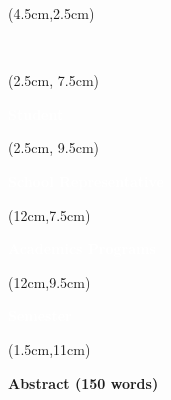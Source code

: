 \begin{titlepage}
    \thispagestyle{empty}

    

    \begin{textblock*}{12cm}(4.5cm,2.5cm)
        \begin{LARGE}
            \makeatletter
            \justifying
            \begin{center}
                \textbf{\textcolor{white}{\jobposition}}
                \\
                \textbf{\textcolor{white}{\thetitle}}
            \end{center}
            \makeatother
        \end{LARGE}
    \end{textblock*}

    \begin{textblock*}{10cm}(2.5cm, 7.5cm)
        \raggedright
        \large
        \textbf{\textcolor{white}{Student}}
        \\
        \textbf{\textcolor{white}{\theauthor}}
    \end{textblock*}

    \begin{textblock*}{10cm}(2.5cm, 9.5cm)
        \raggedright
        \large
        \textbf{\textcolor{white}{School Representative}}
        \\
        \textbf{\textcolor{white}{\theRPeda}}
    \end{textblock*}


    \begin{textblock*}{10cm}(12cm,7.5cm)
        \raggedright
        \large
        \textbf{\textcolor{white}{Academics Programs}}
        \\
        \begin{raggedleft}
            \textcolor{white}{\theUE}
        \end{raggedleft}
    \end{textblock*}

    \begin{textblock*}{10cm}(12cm,9.5cm)
        \large
        \raggedright
        \textbf{\textcolor{white}{Semester}}
        \\
        \textcolor{white}{\theSemestre}
    \end{textblock*}

    \begin{textblock*}{18cm}(1.5cm,11cm)
        \begin{center}
            \normalsize
            \textbf{\textcolor{bleuRoiUTT}{Abstract (150 words)}}
        \end{center}
    \end{textblock*}


\end{titlepage}
